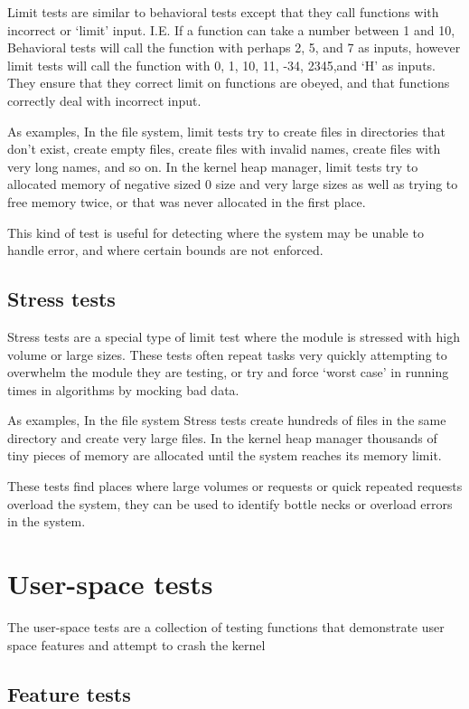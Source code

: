\documentclass[a4paper]{report}
\begin{document}
Limit tests are similar to behavioral tests except that they call functions with incorrect or `limit' input. I.E. If a function can take a number between 1 and 10, Behavioral tests will call the function with perhaps 2, 5, and 7 as inputs, however limit tests will call the function with 0, 1, 10, 11, -34, 2345,and `H' as inputs. They ensure that they correct limit on functions are obeyed, and that functions correctly deal with incorrect input.

As examples, In the file system, limit tests try to create files in directories that don't exist, create empty files, create files with invalid names, create files with very long names, and so on. In the kernel heap manager, limit tests try to allocated memory of negative sized 0 size and very large sizes as well as trying to free memory twice, or that was never allocated in the first place.

This kind of test is useful for detecting where the system may be unable to handle error, and where certain bounds are not enforced.

\subsection{Stress tests}

Stress tests are a special type of limit test where the module is stressed with high volume or large sizes. These tests often repeat tasks very quickly attempting to overwhelm the module they are testing, or try and force `worst case' in running times in algorithms by mocking bad data.

As examples, In the file system Stress tests create hundreds of files in the same directory and create very large files. In the kernel heap manager thousands of tiny pieces of memory are allocated until the system reaches its memory limit.

These tests find places where large volumes or requests or quick repeated requests overload the system, they can be used to identify bottle necks or overload errors in the system.


\section{User-space tests}

The user-space tests are a collection of testing functions that demonstrate user space features and attempt to crash the kernel

\subsection{Feature tests}
\end{document}
